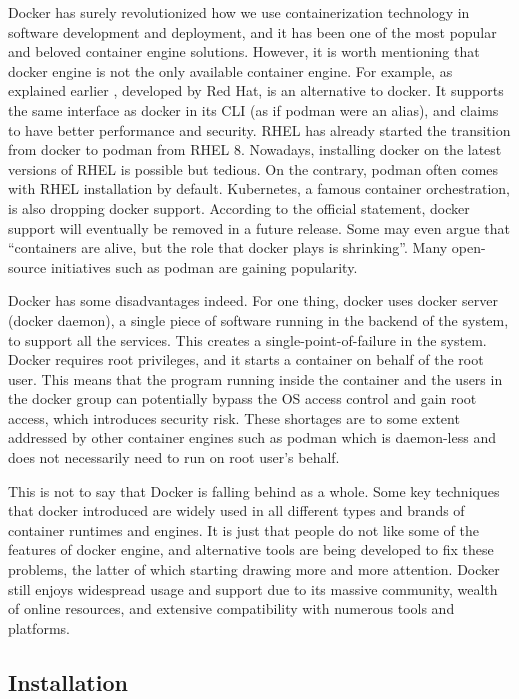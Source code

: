 Docker has surely revolutionized how we use containerization technology in software development and deployment, and it has been one of the most popular and beloved container engine solutions. However, it is worth mentioning that docker engine is not the only available container engine. For example, as explained earlier , developed by Red Hat, is an alternative to docker. It supports the same interface as docker in its CLI (as if podman were an alias), and claims to have better performance and security. RHEL has already started the transition from docker to podman from RHEL 8. Nowadays, installing docker on the latest versions of RHEL is possible but tedious. On the contrary, podman often comes with RHEL installation by default. Kubernetes, a famous container orchestration, is also dropping docker support. According to the official statement, docker support will eventually be removed in a future release. Some may even argue that ``containers are alive, but the role that docker plays is shrinking''. Many open-source initiatives such as podman are gaining popularity.

Docker has some disadvantages indeed. For one thing, docker uses docker server (docker daemon), a single piece of software running in the backend of the system, to support all the services. This creates a single-point-of-failure in the system. Docker requires root privileges, and it starts a container on behalf of the root user. This means that the program running inside the container and the users in the docker group can potentially bypass the OS access control and gain root access, which introduces security risk. These shortages are to some extent addressed by other container engines such as podman which is daemon-less and does not necessarily need to run on root user's behalf.

This is not to say that Docker is falling behind as a whole. Some key techniques that docker introduced are widely used in all different types and brands of container runtimes and engines. It is just that people do not like some of the features of docker engine, and alternative tools are being developed to fix these problems, the latter of which starting drawing more and more attention. Docker still enjoys widespread usage and support due to its massive community, wealth of online resources, and extensive compatibility with numerous tools and platforms. 

\subsection{Installation}

